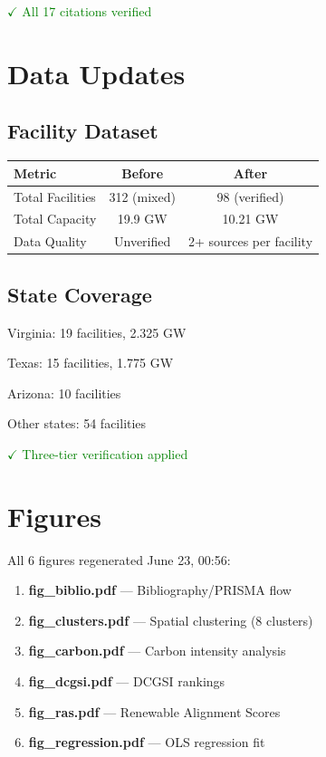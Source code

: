 \documentclass[11pt,a4paper]{article}
\begin{document}
\textcolor{green}{$\checkmark$ All 17 citations verified}

\section{Data Updates}

\subsection{Facility Dataset}

\begin{center}
\begin{tabular}{lcc}
\toprule
\textbf{Metric} & \textbf{Before} & \textbf{After} \\
\midrule
Total Facilities & 312 (mixed) & 98 (verified) \\
Total Capacity & 19.9 GW & 10.21 GW \\
Data Quality & Unverified & 2+ sources per facility \\
\bottomrule
\end{tabular}
\end{center}

\subsection{State Coverage}

Virginia: 19 facilities, 2.325 GW

Texas: 15 facilities, 1.775 GW

Arizona: 10 facilities

Other states: 54 facilities

\textcolor{green}{$\checkmark$ Three-tier verification applied}

\section{Figures}

All 6 figures regenerated June 23, 00:56:

\begin{enumerate}
\item \textbf{fig\_biblio.pdf} --- Bibliography/PRISMA flow
\item \textbf{fig\_clusters.pdf} --- Spatial clustering (8 clusters)
\item \textbf{fig\_carbon.pdf} --- Carbon intensity analysis
\item \textbf{fig\_dcgsi.pdf} --- DCGSI rankings
\item \textbf{fig\_ras.pdf} --- Renewable Alignment Scores
\item \textbf{fig\_regression.pdf} --- OLS regression fit
\end{enumerate}
\end{document}
